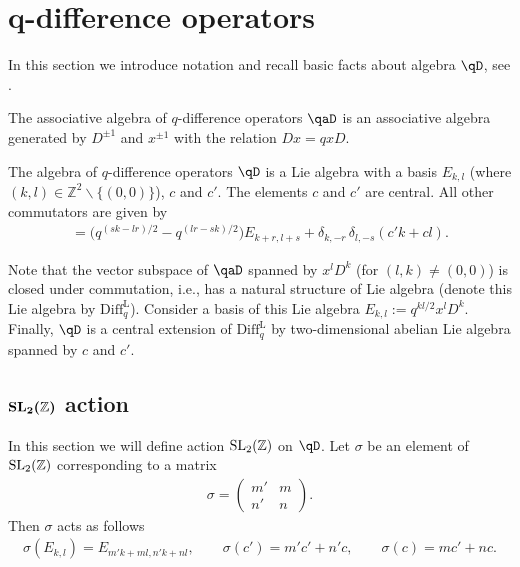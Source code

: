 \section[$q$-difference operators]{$\boldsymbol{q}$-difference operators} \label{q-dif}

In this section we introduce notation and recall basic facts about algebra $\qD$, see \cite{FFZ, GL,KR93}.
\begin{Definition}
The associative algebra of $q$-difference operators $\qaD$ is an associative algebra generated by $D^{\pm 1}$ and $x^{\pm 1}$ with the relation $Dx=qxD$.
\end{Definition}

\begin{Definition}
The algebra of $q$-difference operators $\qD$ is a Lie algebra with a basis $E_{k,l}$ {\upshape(}where $(k, l) \in \mathbb{Z}^2 \backslash \{(0,0) \}${\upshape)}, $c$ and $c'$. The elements $c$ and $c'$ are central. All other commutators are given by
\begin{gather}
[ E_{k,l} , E_{r,s} ] = \big( q^{(sk-lr)/2}-q^{(lr-sk)/2} \big) E_{k+r, l+s} + \delta_{k, -r} \, \delta_{l, -s} ( c' k + c l ). \label{qDc}
\end{gather}
\end{Definition}

\begin{Remark}Note that the vector subspace of $\qaD$ spanned by $x^l D^k$ (for $(l,k) \neq (0,0)$) is closed under commutation, i.e., has a natural structure of Lie algebra (denote this Lie algebra by $\mathrm{Diff}_q^{\mathrm{L}}$). Consider a basis of this Lie algebra $E_{k,l} := q^{kl/2} x^l D^k$. Finally, $\qD$ is a central extension of $\mathrm{Diff}_q^{\mathrm{L}}$ by two-dimensional abelian Lie algebra spanned by $c$ and $c'$.
\end{Remark}

\subsection[${\rm SL}_2(\mathbb{Z} )$ action]{$\boldsymbol{{\rm SL}_2(\mathbb{Z} )}$ action}

In this section we will define action ${\rm SL}_2 ( \mathbb{Z} )$ on $\qD$. Let $\sigma$ be an element of ${\rm SL}_2 ( \mathbb{Z} )$ corresponding to a matrix
\begin{gather*}
\sigma = \begin{pmatrix}
m' & m \\
n' & n
\end{pmatrix}. %
\end{gather*}
Then $\sigma$ acts as follows
\begin{gather} \label{action1}
\sigma( E_{k,l} ) = E_{ m' k + m l, n' k + n l }, \qquad
\sigma (c') = m' c' + n' c, \qquad \sigma (c) = m c' + n c.
\end{gather}

